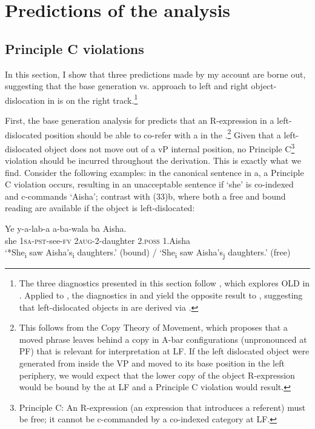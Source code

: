 \documentclass[output=paper
,newtxmath
,modfonts
,nonflat]{langsci/langscibook}
\begin{document}
\section{Predictions of the analysis}\label{sec:ranero:5}
\subsection{Principle C violations}\label{sec:ranero:5.1}

\textup{In this section, I show that three predictions made by my account are borne out, suggesting that the base generation vs.  approach to left and right object-dislocation in  is on the right track}.\footnote{The three diagnostics presented in this section follow \citet{zeller2009}, which explores OLD in . Applied to , the diagnostics in  and  yield the opposite result to , suggesting that left-dislocated objects in  are derived via .} 



\textup{First, the base generation analysis for  predicts that an \linebreak R-expression in a left-dislocated position should be able to co-refer with a  in the .}\footnote{This follows from the Copy Theory of Movement, which proposes that a moved phrase leaves behind a copy in A-bar  configurations (unpronounced at PF) that is relevant for interpretation at LF. If the left dislocated object were generated from inside the VP and moved to its base position in the left periphery, we would expect that the lower copy of the object R-expression would be bound by the  at LF and a Principle C violation would result.} \textup{Given that a left-dislocated object does not move out of a} v\textup{P internal position, no Principle C}\footnote{Principle C: An R-expression (an expression that introduces a referent) must be free; it cannot be c-commanded by a co-indexed category at LF.} \textup{violation should be incurred throughout the derivation. This is exactly what we find. Consider the following examples: in the canonical sentence in a, a Principle C violation occurs, resulting in an unacceptable sentence if ‘she’ is co-indexed and c-commands ‘Aisha’; contrast with (33)b, where both a free and bound reading are available if the object is left-dislocated:}


\ea\label{ex:ranero:33}
\ea\label{ex:ranero:33a}
\gll Ye  y-a-lab-a           a-ba-wala      ba        Aisha.\\
she \textsc{1sa-pst}{}-see\textsc{{}-fv} 2\textsc{aug}{}-2-daughter 2.\textsc{poss} 1.Aisha\\
\glt ‘*She\textsubscript{i} saw Aisha’s\textsubscript{i} daughters.’ (bound) / ‘She\textsubscript{i} saw Aisha’s\textsubscript{j} daughters.’ (free)
\end{document}
